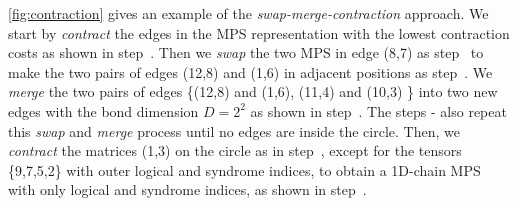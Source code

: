 \autoref{fig:contraction} gives an example of the \textit{swap-merge-contraction} approach. We start by \textit{contract} the edges in the MPS representation with the lowest contraction costs as shown in step~. Then we \textit{swap} the two MPS in edge (8,7) as step~ to make the two pairs of edges (12,8) and (1,6) in adjacent positions as step~. We \textit{merge} the two pairs of edges \{(12,8) and (1,6), (11,4) and (10,3) \} into two new edges with the bond dimension $D=2^2$ as shown in step~. The steps - also repeat this \textit{swap} and \textit{merge} process until no edges are inside the circle. Then, we \textit{contract} the matrices (1,3) on the circle as in step~, except for the tensors \{9,7,5,2\} with outer logical and syndrome indices, to obtain a 1D-chain MPS with only logical and syndrome indices, as shown in step~.
